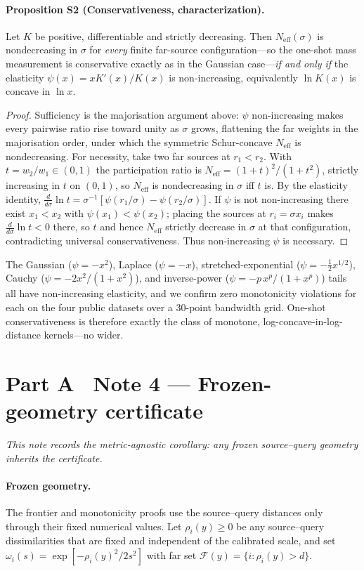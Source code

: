 \documentclass[10pt,twocolumn]{article}
\newcommand{\Neff}{N_{\mathrm{eff}}}
\begin{document}
\paragraph{Proposition S2 (Conservativeness, characterization).}\label{prop:conserv-gen}
Let $K$ be positive, differentiable and strictly decreasing. Then $\Neff(\sigma)$ is nondecreasing in $\sigma$ for \emph{every} finite far-source configuration---so the one-shot mass measurement is conservative exactly as in the Gaussian case---\emph{if and only if} the elasticity $\psi(x)=xK'(x)/K(x)$ is non-increasing, equivalently $\ln K(x)$ is concave in $\ln x$.
\begin{proof}
Sufficiency is the majorisation argument above: $\psi$ non-increasing makes every pairwise ratio rise toward unity as $\sigma$ grows, flattening the far weights in the majorisation order, under which the symmetric Schur-concave $\Neff$ is nondecreasing. For necessity, take two far sources at $r_1<r_2$. With $t=w_2/w_1\in(0,1)$ the participation ratio is $\Neff=(1+t)^2/(1+t^2)$, strictly increasing in $t$ on $(0,1)$, so $\Neff$ is nondecreasing in $\sigma$ iff $t$ is. By the elasticity identity, $\tfrac{d}{d\sigma}\ln t=\sigma^{-1}[\psi(r_1/\sigma)-\psi(r_2/\sigma)]$. If $\psi$ is not non-increasing there exist $x_1<x_2$ with $\psi(x_1)<\psi(x_2)$; placing the sources at $r_i=\sigma x_i$ makes $\tfrac{d}{d\sigma}\ln t<0$ there, so $t$ and hence $\Neff$ strictly decrease in $\sigma$ at that configuration, contradicting universal conservativeness. Thus non-increasing $\psi$ is necessary.
\end{proof}
\noindent The Gaussian ($\psi=-x^2$), Laplace ($\psi=-x$), stretched-exponential ($\psi=-\tfrac12 x^{1/2}$), Cauchy ($\psi=-2x^2/(1+x^2)$), and inverse-power ($\psi=-p\,x^p/(1+x^p)$) tails all have non-increasing elasticity, and we confirm zero monotonicity violations for each on the four public datasets over a $30$-point bandwidth grid. One-shot conservativeness is therefore exactly the class of monotone, log-concave-in-log-distance kernels---no wider.


\section*{Part A \textperiodcentered\ Note 4 --- Frozen-geometry certificate}
\emph{This note records the metric-agnostic corollary: any frozen source--query geometry inherits the certificate.}
\paragraph{Frozen geometry.} The frontier and monotonicity proofs use the source--query distances only through their fixed numerical values. Let $\rho_i(y)\ge0$ be any source--query dissimilarities that are fixed and independent of the calibrated scale, and set $\omega_i(s)=\exp[-\rho_i(y)^2/2s^2]$ with far set $\mathcal{F}(y)=\{i:\rho_i(y)>d\}$.
\end{document}

